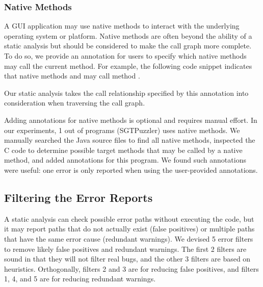 \subsubsection{Native Methods}
\label{sec:annotation}

A GUI application may use native methods to interact with the underlying
operating system or platform. Native methods are often
beyond the ability of a static analysis but should be considered to make
the call graph more complete. To do so, we provide an annotation 
for users to specify which native methods may call the current method. For example,
the following code snippet indicates that native methods  and 
may call method .

{}

{}


\noindent Our static analysis takes the call relationship specified by this
annotation into consideration when traversing the call graph. 

Adding annotations for native methods is optional and requires manual effort.
In our experiments, 1 out of \subnum programs (SGTPuzzler) uses native methods. We manually
searched the Java source files to find all native methods,
inspected the C code to determine possible target methods
that may be called by a native method, and added \annotationnum annotations for this program.
We found such annotations were useful: one error
is only reported when using the user-provided annotations.


\subsection{Filtering the Error Reports}
\label{sec:heuristic}

A static analysis can check possible error paths without executing the
code, but it may report
paths that do not actually exist (false positives) or multiple paths
that have the same error cause (redundant warnings). We devised
5 error filters to remove likely false positives and redundant warnings.
The first 2 filters are sound in that they will not filter real bugs, and
the other 3 filters are based on heuristics. Orthogonally, filters 2
and 3 are for reducing false positives, and filters 1, 4, and 5
are for reducing redundant warnings.


